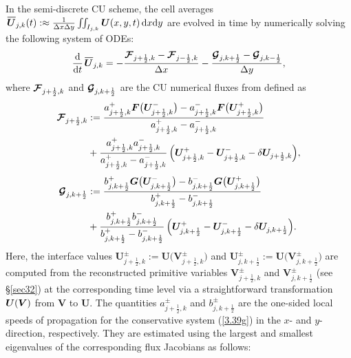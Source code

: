\documentclass[preprint,12pt]{elsarticle}
\newcommand{\dx}{\Delta x}
\newcommand{\dy}{\Delta y}
\newcommand{\kph}{{k+\frac{1}{2}}}
\newcommand{\kmh}{{k-\frac{1}{2}}}
\newcommand{\jph}{{j+\frac{1}{2}}}
\newcommand{\jmh}{{j-\frac{1}{2}}}
\newcommand{\bV}{\bm{V}}
\newcommand\eref[1]{(\ref{#1})}
\newcommand*\xbar[1]{%
	\hbox{%
		\vbox{%
			\hrule height 0.5pt %
			\kern0.4ex%
			\hbox{%
				\kern-0.05em%
				\ensuremath{#1}%
				\kern-0.00em%
			}%
		}%
	}%
}
\newcommand{\uvec}[2][3]{\boldsymbol{#2\mkern-#1mu}\mkern#1mu}
\newcommand{\bU}{\uvec{U}}
\begin{document}
In the semi-discrete CU scheme, the cell averages
$\,\xbar{\bm U}_{j,k}(t):\approx\frac{1}{\dx\dy}\iint_{I_{j,k}}\bm U(x,y,t)\,{\rm d}x{\rm d}y$ are evolved in time by numerically solving
the following system of ODEs:
\begin{equation}
	\frac{{\rm d}}{{\rm d}t}\,\xbar{\bm U}_{j,k}=-\frac{\bm{{\cal F}}_{\jph,k}-\bm{{\cal F}}_{\jmh,k}}{\dx}-
	\frac{\bm{{\cal G}}_{j,\kph}-\bm{{\cal G}}_{j,\kmh}}{\dy},
	\label{2.15a}
\end{equation}
where $\bm{{\cal F}}_{\jph,k}$ and $\bm{{\cal G}}_{j,\kph}$ are the CU numerical fluxes from \cite{KLin} defined as
\begin{equation}
	\begin{aligned}
		\bm{{\cal F}}_{\jph,k}&:=\frac{a^+_{\jph,k}\bm F\big(\bm U^-_{\jph,k}\big)-a^-_{\jph,k}\bm F\big(\bm U^+_{\jph,k}\big)}
		{a^+_{\jph,k}-a^-_{\jph,k}}\\
		&+\frac{a^+_{\jph,k}a^-_{\jph,k}}{a^+_{\jph,k}-a^-_{\jph,k}}\,\Big(\bm U^+_{\jph,k}-\bm U^-_{\jph,k}-\delta\bm U_{\jph,k}\Big),\\[0.8ex]
		\bm{{\cal G}}_{j,\kph}&:=\frac{b^+_{j,\kph}\bm G\big(\bm U^-_{j,\kph}\big)-b^-_{j,\kph}\bm G\big(\bm U^+_{j,\kph}\big)}
		{b^+_{j,\kph}-b^-_{j,\kph}}\\
		&+\frac{b^+_{j,\kph}b^-_{j,\kph}}{b^+_{j,\kph}-b^-_{j,\kph}}\,\Big(\bm U^+_{j,\kph}-\bm U^-_{j,\kph}-\delta\bm U_{j,\kph}\Big).
	\end{aligned}
	\label{3.41}
\end{equation}
Here, the interface values $\bm U_{\jph,k}^\pm:=\bm U\big(\bm V_{\jph,k}^\pm\big)$ and
$\bm U_{j,\kph}^\pm:=\bm U\big(\bm V_{j,\kph}^\pm\big)$ are computed from the reconstructed primitive variables $\bm V_{\jph,k}^\pm$ and 
$\bm V_{j,\kph}^\pm$ (see \S\ref{sec32}) at the corresponding time level via a straightforward transformation $\bU(\bV)$ from $\bm V$ to
$\bm U$. The quantities $a_{\jph,k}^\pm$ and $b_{j,\kph}^\pm$ are the one-sided local speeds of propagation for the conservative system
\eref{3.39g} in the $x$- and $y$-direction, respectively. They are estimated using the largest and smallest eigenvalues of the corresponding
flux Jacobians as follows:
\end{document}
